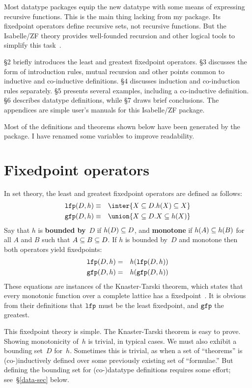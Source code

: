 Most datatype packages equip the new datatype with some means of expressing
recursive functions.  This is the main thing lacking from my package.  Its
fixedpoint operators define recursive sets, not recursive functions.  But
the Isabelle/ZF theory provides well-founded recursion and other logical
tools to simplify this task~\cite{paulson-set-II}.

\S2 briefly introduces the least and greatest fixedpoint operators.  \S3
discusses the form of introduction rules, mutual recursion and other points
common to inductive and co-inductive definitions.  \S4 discusses induction
and co-induction rules separately.  \S5 presents several examples,
including a co-inductive definition.  \S6 describes datatype definitions,
while \S7 draws brief conclusions.  \ifCADE\else The appendices are simple
user's manuals for this Isabelle/ZF package.\fi

Most of the definitions and theorems shown below have been generated by the
package.  I have renamed some variables to improve readability.
 
\section{Fixedpoint operators}
In set theory, the least and greatest fixedpoint operators are defined as
follows:
\begin{eqnarray*}
   \lfp(D,h)  & \equiv & \inter\{X\sbs D. h(X)\sbs X\} \\
   \gfp(D,h)  & \equiv & \union\{X\sbs D. X\sbs h(X)\}
\end{eqnarray*}   
Say that $h$ is {\bf bounded by}~$D$ if $h(D)\subseteq D$, and {\bf monotone} if
$h(A)\subseteq h(B)$ for all $A$ and $B$ such that $A\subseteq B\subseteq D$.  If $h$ is
bounded by~$D$ and monotone then both operators yield fixedpoints:
\begin{eqnarray*}
   {\tt lfp}(D,h)  & = & h({\tt lfp}(D,h)) \\
   {\tt gfp}(D,h)  & = & h({\tt gfp}(D,h)) 
\end{eqnarray*}   
These equations are instances of the Knaster-Tarski theorem, which states
that every monotonic function over a complete lattice has a
fixedpoint~\cite{davey&priestley}.  It is obvious from their definitions
that  ${\tt lfp}$ must be the least fixedpoint, and ${\tt gfp}$ the greatest.

This fixedpoint theory is simple.  The Knaster-Tarski theorem is easy to
prove.  Showing monotonicity of~$h$ is trivial, in typical cases.  We must
also exhibit a bounding set~$D$ for~$h$.  Sometimes this is trivial, as
when a set of ``theorems'' is (co-)inductively defined over some previously
existing set of ``formulae.''  But defining the bounding set for
(co-)datatype definitions requires some effort; see~\S\ref{data-sec} below.


